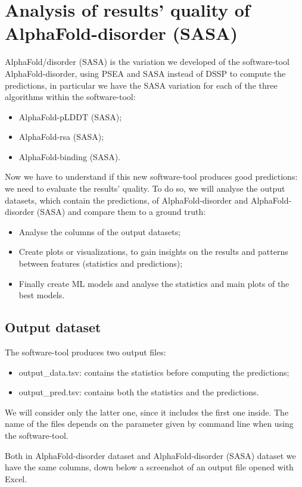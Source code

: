 \chapter{Analysis of results' quality of AlphaFold-disorder (SASA)}
\label{chp:analysis}
AlphaFold/disorder (SASA) is the variation we developed of the software-tool AlphaFold-disorder, using PSEA and SASA instead of DSSP to compute the predictions, in particular we have the SASA variation for each of the three algorithms within the software-tool:
\begin{itemize}
    \item AlphaFold-pLDDT (SASA);
    \item AlphaFold-rsa (SASA);
    \item AlphaFold-binding (SASA).
\end{itemize}

Now we have to understand if this new software-tool produces good predictions: we need to evaluate the results' quality. To do so, we will analyse the output datasets, which contain the predictions, of AlphaFold-disorder and AlphaFold-disorder (SASA) and compare them to a ground truth:
\begin{itemize}
    \item Analyse the columns of the output datasets;
    \item Create plots or visualizations, to gain insights on the results and patterns between features (statistics and predictions);
    \item Finally create ML models and analyse the statistics and main plots of the best models.
\end{itemize}

\section{Output dataset}
The software-tool produces two output files:
\begin{itemize}
    \item output\_data.tsv: contains the statistics before computing the predictions;
    \item output\_pred.tsv: contains both the statistics and the predictions.
\end{itemize}
We will consider only the latter one, since it includes the first one inside. The name of the files depends on the parameter given by command line when using the software-tool. 

Both in AlphaFold-disorder dataset and AlphaFold-disorder (SASA) dataset we have the same columns, down below a screenshot of an output file opened with Excel.

